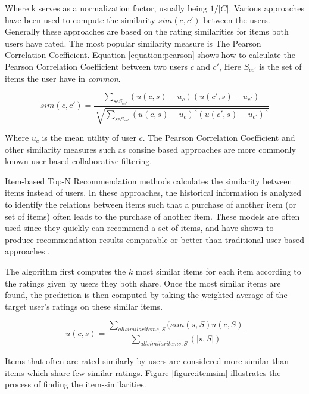 Where k serves as a normalization factor, usually being $1/|C|$. Various
approaches have been used to compute the similarity $sim(c, c')$ between the
users. Generally these approaches are based on the rating similarities for
items both users have rated. The most popular similarity measure is The Pearson
Correlation Coefficient. Equation \ref{equation:pearson} shows how to calculate
the Pearson Correlation Coefficient between two users $c$ and $c'$, Here
$S_{cc'}$ is the set of items the user have in \emph{common}.

\begin{equation}
sim(c, c') = \frac{\sum_{s \epsilon S_{cc'}} (u(c, s)-\bar{u_{c}})(u(c',s)-\bar{u_{c'}})}{\sqrt[•]{\sum_{s \epsilon S_{cc'}} (u(c, s)-\bar{u_{c}})^{2}(u(c',s)-\bar{u_{c'}})^{2}}}
\label{equation:pearson}
\end{equation}

Where $u_{c}$ is the mean utility of user $c$. The Pearson Correlation
Coefficient and other similarity measures such as consine based approaches are
more commonly known user-based collaborative filtering.\linebreak[2]

Item-based Top-N Recommendation methods calculates the similarity between items
instead of users. In these approaches, the historical information is analyzed
to identify the relations between items such that a purchase of another item
(or set of items) often leads to the purchase of another item. These models are
often used since they quickly can recommend a set of items, and have shown to
produce recommendation results comparable or better than traditional user-based
approaches \cite{Karypis2001}.

The algorithm first computes the $k$ most similar items for each item according
to the ratings given by users they both share. Once the most similar items are
found, the prediction is then computed by taking the weighted average of the
target user's ratings on these similar items.

\begin{equation}
u(c,s) = \frac{\sum_{all similar items, S} (sim(s,S)u(c, S)}{\sum_{all similar items, S}(|s,S|)}
\end{equation}

Items that often are rated similarly by users are considered more similar than
items which share few similar ratings. Figure \ref{figure:itemsim} illustrates
the process of finding the item-similarities.

